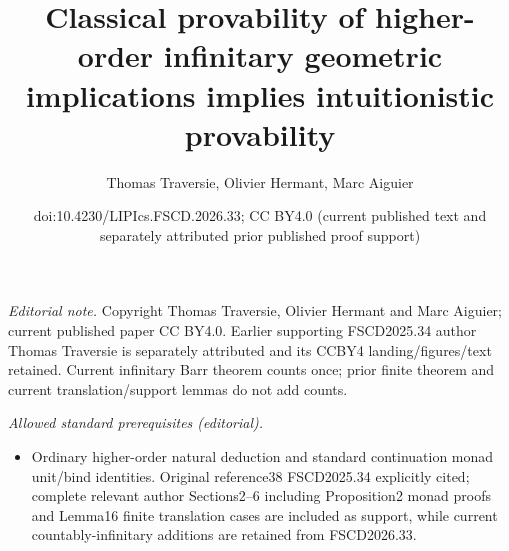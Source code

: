 \documentclass[10pt,a4paper]{article}
\title{Classical provability of higher-order infinitary geometric implications implies intuitionistic provability}
\author{Thomas Traversie, Olivier Hermant, Marc Aiguier}
\date{doi:10.4230/LIPIcs.FSCD.2026.33; CC BY4.0 (current published text and separately attributed prior published proof support)}
\begin{document}
\maketitle
\noindent\textit{Editorial note.} Copyright Thomas Traversie, Olivier Hermant and Marc Aiguier; current published paper CC BY4.0. Earlier supporting FSCD2025.34 author Thomas Traversie is separately attributed and its CCBY4 landing/figures/text retained. Current infinitary Barr theorem counts once; prior finite theorem and current translation/support lemmas do not add counts.\par\medskip
\noindent\textit{Allowed standard prerequisites (editorial).}\begin{itemize}
\item Ordinary higher-order natural deduction and standard continuation monad unit/bind identities. Original reference38 FSCD2025.34 explicitly cited; complete relevant author Sections2--6 including Proposition2 monad proofs and Lemma16 finite translation cases are included as support, while current countably-infinitary additions are retained from FSCD2026.33.
\end{itemize}\medskip
\end{document}
